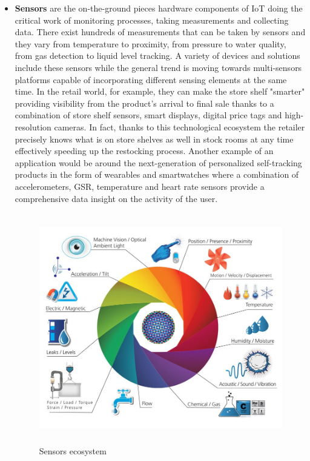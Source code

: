 \begin{itemize}
  \item \textbf{Sensors} are the on-the-ground pieces hardware components of IoT doing the critical work of monitoring processes, taking measurements and collecting data. There exist hundreds of measurements that can be taken by sensors and they vary from temperature to proximity, from pressure to water quality, from gas detection to liquid level tracking. A variety of devices and solutions include these sensors while the general trend is moving towards multi-sensors platforms capable of incorporating different sensing elements at the same time. In the retail world, for example, they can make the store shelf "smarter" providing visibility from the product's arrival to final sale thanks to a combination of store shelf sensors, smart displays, digital price tags and high-resolution cameras. In fact, thanks to this technological ecosystem the retailer precisely knows what is on store shelves as well in stock rooms at any time effectively speeding up the restocking process. 
  Another example of an application would be around the next-generation of personalized self-tracking products in the form of wearables and smartwatches where a combination of accelerometers, GSR, temperature and heart rate sensors provide a comprehensive data insight on the activity of the user.   

  \vspace{0.5cm}
  \begin{figure}[htbp]
    \centering
      \includegraphics[height=10cm]{images/iot-sensors.jpg}
    \caption{Sensors ecosystem}
    \label{fig:sensors}
  \end{figure}
  \vspace{0.5cm}

\end{itemize} 

